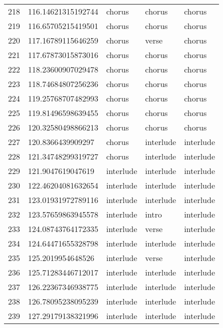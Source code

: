 \begin{table}[]
\begin{tabular}{lllll}
    218  & 116.14621315192744 & chorus       & chorus          & chorus         \\
    219  & 116.65705215419501 & chorus       & chorus          & chorus         \\
    220  & 117.16789115646259 & chorus       & verse           & chorus         \\
    221  & 117.67873015873016 & chorus       & chorus          & chorus         \\
    222  & 118.23600907029478 & chorus       & chorus          & chorus         \\
    223  & 118.74684807256236 & chorus       & chorus          & chorus         \\
    224  & 119.25768707482993 & chorus       & chorus          & chorus         \\
    225  & 119.81496598639455 & chorus       & chorus          & chorus         \\
    226  & 120.32580498866213 & chorus       & chorus          & chorus         \\
    227  & 120.8366439909297  & chorus       & interlude       & interlude      \\
    228  & 121.34748299319727 & chorus       & interlude       & interlude      \\
    229  & 121.9047619047619  & interlude    & interlude       & interlude      \\
    230  & 122.46204081632654 & interlude    & interlude       & interlude      \\
    231  & 123.01931972789116 & interlude    & interlude       & interlude      \\
    232  & 123.57659863945578 & interlude    & intro           & interlude      \\
    233  & 124.08743764172335 & interlude    & verse           & interlude      \\
    234  & 124.64471655328798 & interlude    & interlude       & interlude      \\
    235  & 125.2019954648526  & interlude    & verse           & interlude      \\
    236  & 125.71283446712017 & interlude    & interlude       & interlude      \\
    237  & 126.22367346938775 & interlude    & interlude       & interlude      \\
    238  & 126.78095238095239 & interlude    & interlude       & interlude      \\
    239  & 127.29179138321996 & interlude    & interlude       & interlude      \\

\end{tabular}
\end{table}
